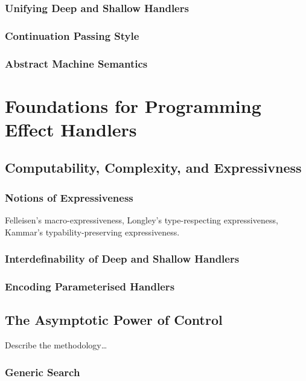 \documentclass[11pt,phd,lfcs,twoside,openright,logo,leftchapter,normalheadings]{infthesis}
\begin{document}
\section{Unifying Deep and Shallow Handlers}
\section{Continuation Passing Style}
\section{Abstract Machine Semantics}


\part{Foundations for Programming Effect Handlers}
\chapter{Computability, Complexity, and Expressivness}
\label{ch:expressiveness}
\section{Notions of Expressiveness}
Felleisen's macro-expressiveness, Longley's type-respecting
expressiveness, Kammar's typability-preserving expressiveness.

\section{Interdefinability of Deep and Shallow Handlers}
\section{Encoding Parameterised Handlers}

\chapter{The Asymptotic Power of Control}
\label{ch:handlers-efficiency}
Describe the methodology\dots
\section{Generic Search}
\end{document}
